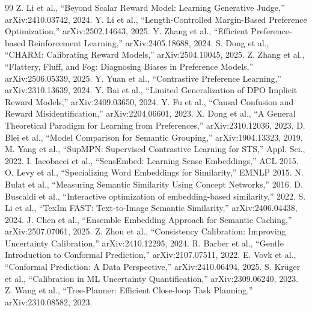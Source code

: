 \documentclass[12pt,a4paper]{report}
\begin{document}
\begin{thebibliography}{99}
 Z. Li et al., ``Beyond Scalar Reward Model: Learning Generative Judge,'' arXiv:2410.03742, 2024.
 Y. Li et al., ``Length-Controlled Margin-Based Preference Optimization,'' arXiv:2502.14643, 2025.
 Y. Zhang et al., ``Efficient Preference-based Reinforcement Learning,'' arXiv:2405.18688, 2024.
 S. Dong et al., ``CHARM: Calibrating Reward Models,'' arXiv:2504.10045, 2025.
 Z. Zhang et al., ``Flattery, Fluff, and Fog: Diagnosing Biases in Preference Models,'' arXiv:2506.05339, 2025.
 Y. Yuan et al., ``Contrastive Preference Learning,'' arXiv:2310.13639, 2024.
 Y. Bai et al., ``Limited Generalization of DPO Implicit Reward Models,'' arXiv:2409.03650, 2024.
 Y. Fu et al., ``Causal Confusion and Reward Misidentification,'' arXiv:2204.06601, 2023.
 X. Dong et al., ``A General Theoretical Paradigm for Learning from Preferences,'' arXiv:2310.12036, 2023.
 D. Blei et al., ``Model Comparison for Semantic Grouping,'' arXiv:1904.13323, 2019.
 M. Yang et al., ``SupMPN: Supervised Contrastive Learning for STS,'' Appl. Sci., 2022.
 I. Iacobacci et al., ``SensEmbed: Learning Sense Embeddings,'' ACL 2015.
 O. Levy et al., ``Specializing Word Embeddings for Similarity,'' EMNLP 2015.
 N. Bulat et al., ``Measuring Semantic Similarity Using Concept Networks,'' 2016.
 D. Buscaldi et al., ``Interactive optimization of embedding-based similarity,'' 2022.
 S. Li et al., ``TexIm FAST: Text-to-Image Semantic Similarity,'' arXiv:2406.04438, 2024.
 J. Chen et al., ``Ensemble Embedding Approach for Semantic Caching,'' arXiv:2507.07061, 2025.
 Z. Zhou et al., ``Consistency Calibration: Improving Uncertainty Calibration,'' arXiv:2410.12295, 2024.
 R. Barber et al., ``Gentle Introduction to Conformal Prediction,'' arXiv:2107.07511, 2022.
 E. Vovk et al., ``Conformal Prediction: A Data Perspective,'' arXiv:2410.06494, 2025.
 S. Krüger et al., ``Calibration in ML Uncertainty Quantification,'' arXiv:2309.06240, 2023.
 Z. Wang et al., ``Tree-Planner: Efficient Close-loop Task Planning,'' arXiv:2310.08582, 2023.

\end{thebibliography}
\end{document}
